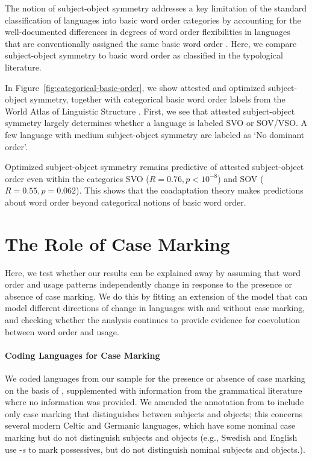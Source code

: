 \documentclass[11pt,a4paper]{article}
\begin{document}
The notion of subject-object symmetry addresses a key limitation of the standard classification of languages into basic word order categories by accounting for the well-documented differences in degrees of word order flexibilities in languages that are conventionally assigned the same basic word order \citep{steele1978word}.
Here, we compare subject-object symmetry to basic word order as classified in the typological literature.


In Figure~\ref{fig:categorical-basic-order}, we show attested and optimized subject-object symmetry, together with categorical basic word order labels from the World Atlas of Linguistic Structure \citep{wals-81}.
First, we see that attested subject-object symmetry largely determines whether a language is labeled SVO or SOV/VSO.
A few language with medium subject-object symmetry are labeled as `No dominant order'.

Optimized subject-object symmetry remains predictive of attested subject-object order even within the categories SVO ($R = 0.76, p < 10^{-8}$) and SOV ($R=0.55, p = 0.062$).
This shows that the coadaptation theory makes predictions about word order beyond categorical notions of basic word order.



\section{The Role of Case Marking}

Here, we test whether our results can be explained away by assuming that word order and usage patterns independently change in response to the presence or absence of case marking.
We do this by fitting an extension of the model that can model different directions of change in languages with and without case marking, and checking whether the analysis continues to provide evidence for coevolution between word order and usage.

\paragraph{Coding Languages for Case Marking}
We coded languages from our sample for the presence or absence of case marking on the basis of \citep{wals-49}, supplemented with information from the grammatical literature where no information was provided.
We amended the annotation from \citep{wals-49} to include only case marking that distinguishes between subjects and objects; this concerns several modern Celtic and Germanic languages, which have some nominal case marking but do not distinguish subjects and objects (e.g., Swedish and English use -\textit{s} to mark possessives, but do not distinguish nominal subjects and objects.).
\end{document}
